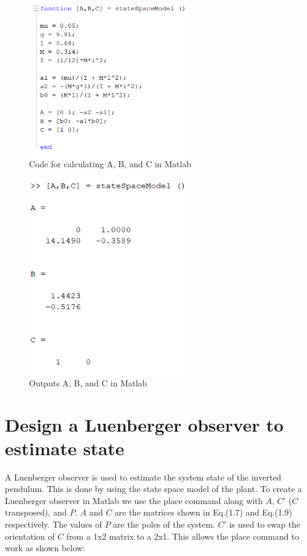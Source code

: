\documentclass[11pt]{report}
\begin{document}
\begin{figure}[H]
\centerline{\includegraphics[width=7cm]{stateSpaceModel.png}}
\caption{Code for calculating A, B, and C in Matlab}
\label{fig}
\end{figure}

\begin{figure}[H]
\centerline{\includegraphics[width=7cm]{stateSpaceModeloutputs.png}}
\caption{Outputs A, B, and C in Matlab}
\label{fig}
\end{figure}

\section{Design a Luenberger observer to estimate state}

A Luenberger observer is used to estimate the system state of the inverted pendulum. This is done by using the state space model of the plant. To create a Luenberger observer in Matlab we use the place command along with $A$, $C'$ ($C$ transposed), and $P$. $A$ and $C$ are the matrices shown in Eq.(1.7) and Eq.(1.9) respectively. The values of $P$ are the poles of the system. $C'$ is used to swap the orientation of $C$ from a 1x2 matrix to a 2x1. This allows the place command to work as shown below:  
\end{document}
